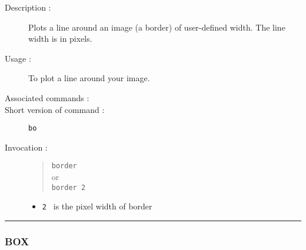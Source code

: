 \begin{description}

\item[Description :] Plots a line around an image (a border) of
user-defined width.  The line width is in pixels.

\item[Usage :] To plot a line around your image.
\item[Associated commands :] {\tt {}}
\item[Short version of command :] {\tt bo}
\item[Invocation :]

\begin{quote}{\tt  border }\\
or \\
{\tt border 2 }
\end{quote}

\begin{itemize}

\item {\tt 2 } is the pixel width of border

\end{itemize}

\end{description}

\hrule
\subsubsection*{\label{BOX}BOX}

